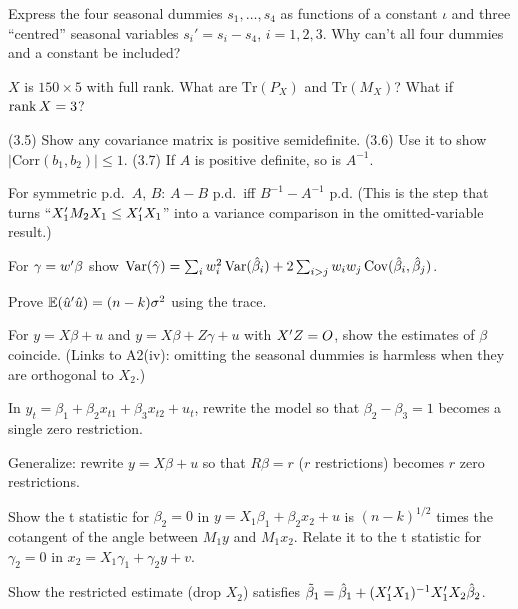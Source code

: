 \documentclass[11pt]{article}
\begin{document}
 Express the four seasonal dummies $s_{1},\dots,s_{4}$ as
functions of a constant $\iota$ and three ``centred'' seasonal variables
$s_{i}' = s_{i} - s_{4}$, $i = 1,2,3$. Why can't all four dummies and a constant
be included?

 $X$ is $150 \times 5$ with full rank. What are
$\mathrm{Tr}(P_{X})$ and $\mathrm{Tr}(M_{X})$? What if $\operatorname{rank} X = 3$?


 (3.5) Show any covariance matrix is positive
semidefinite. (3.6) Use it to show $|\mathrm{Corr}(b_{1},b_{2})| \le 1$.
(3.7) If $A$ is positive definite, so is $A^{-1}$.

 For symmetric p.d.\ $A$, $B$: $A - B$ p.d.\ iff
$B^{-1} - A^{-1}$ p.d. (This is the step that turns ``$X_{1}^{\prime} M_{2}X_{1} \le X_{1}^{\prime} X_{1}$''
into a variance comparison in the omitted-variable result.)

 For $\gamma = w^{\prime}\beta$ show
$\operatorname{Var}(\hat\gamma) = \sum_{i}w_{i}^{2}\operatorname{Var}(\hat\beta_{i}) + 2\sum_{i>j}w_{i}w_{j}\operatorname{Cov}(\hat\beta_{i},\hat\beta_{j})$.

 Prove $\mathbb{E}(\hat u^{\prime}\hat u) = (n-k)\sigma^{2}$ using the trace.

 For $y = X\beta + u$ and $y = X\beta + Z\gamma + u$ with
$X^{\prime} Z = O$, show the estimates of $\beta$ coincide. (Links to A2(iv): omitting the
seasonal dummies is harmless when they are orthogonal to $X_{2}$.)


 In $y_{t} = \beta_{1} + \beta_{2}x_{t1} + \beta_{3}x_{t2} + u_{t}$,
rewrite the model so that $\beta_{2} - \beta_{3} = 1$ becomes a single zero restriction.

 Generalize: rewrite $y = X\beta + u$ so that $R\beta = r$
($r$ restrictions) becomes $r$ zero restrictions.

 Show the t statistic for $\beta_{2} = 0$ in
$y = X_{1}\beta_{1} + \beta_{2}x_{2} + u$ is $(n-k)^{1/2}$ times the cotangent of the
angle between $M_{1}y$ and $M_{1}x_{2}$. Relate it to the t statistic for
$\gamma_{2} = 0$ in $x_{2} = X_{1}\gamma_{1} + \gamma_{2}y + v$.

 Show the restricted estimate (drop $X_{2}$) satisfies
$\tilde\beta_{1} = \hat\beta_{1} + (X_{1}^{\prime} X_{1})^{-1}X_{1}^{\prime} X_{2}\hat\beta_{2}$.
\end{document}

